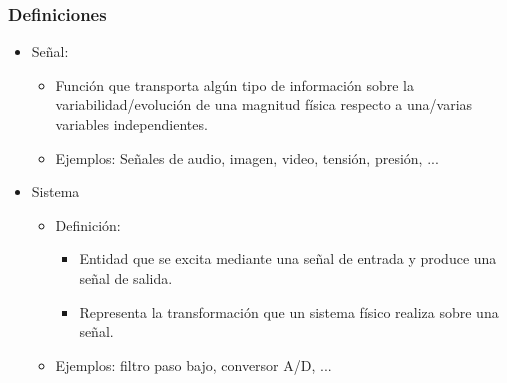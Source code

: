 \begin{frame}
  \frametitle{Definiciones}

  \begin{figure}
    \centering
    \small
  \end{figure}
  \vspace{-0.3cm}
  \begin{itemize}
    \item \alert{Señal:}
    \begin{itemize}
      \item Función que transporta algún tipo de información sobre la variabilidad/evolución de una magnitud física respecto a una/varias variables independientes.
      \vspace{0.1cm}
      \item Ejemplos: Señales de audio, imagen, video, tensión, presión, ...
    \end{itemize}
    \item \alert{Sistema}
    \begin{itemize}
      \item Definición:
      \begin{itemize}
        \item Entidad que se excita mediante una señal de entrada y produce una señal de salida.
        \item Representa la transformación que un sistema físico realiza sobre una señal.
      \end{itemize}
      \item Ejemplos: filtro paso bajo, conversor A/D, ...
    \end{itemize}
  \end{itemize}
\end{frame}

